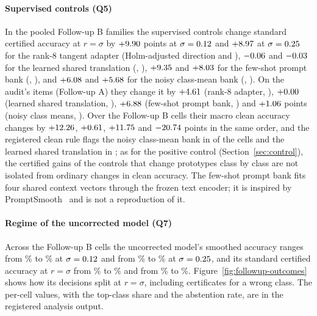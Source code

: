 \paragraph{Supervised controls (Q5)}
In the pooled Follow-up B families the supervised controls change standard
certified accuracy at $r=\sigma$ by $+9.90$ points at
$\sigma=0.12$ and $+8.97$ at $\sigma=0.25$
for the rank-8 tangent adapter (Holm-adjusted direction \FUQFiveLowLowrankDir{}
and \FUQFiveHighLowrankDir), $-0.06$ and
$-0.03$ for the learned shared translation
(\FUQFiveLowSharedDir, \FUQFiveHighSharedDir), $+9.35$ and
$+8.03$ for the few-shot prompt bank
(\FUQFiveLowFewshotDir, \FUQFiveHighFewshotDir), and
$+6.08$ and $+5.68$ for the noisy
class-mean bank (\FUQFiveLowNoisyMeanDir, \FUQFiveHighNoisyMeanDir). On the
audit's items (Follow-up A) they change it by $+4.61$ (rank-8
adapter, \FUQFiveALowrankDir), $+0.00$ (learned shared
translation, \FUQFiveASharedDir), $+6.88$ (few-shot prompt
bank, \FUQFiveAFewshotDir) and $+1.06$ points (noisy class
means, \FUQFiveANoisyMeanDir). Over the Follow-up B cells their macro clean
accuracy changes by $+12.26$, $+0.61$,
$+11.75$ and $-20.74$ points in the same order,
and the registered clean rule flags the noisy class-mean bank in
\FUQFiveNoisyMeanCleanFlagged{} of the \FUCellsB{} cells and the learned shared
translation in \FUQFiveSharedCleanFlagged{}; as for the positive control
(Section~\ref{sec:control}), the certified gains of the controls that change
prototypes class by class are not isolated from ordinary changes in clean
accuracy. The few-shot prompt bank fits four shared context vectors through the frozen text
encoder; it is inspired by PromptSmooth~\cite{hussein2024promptsmooth} and is
not a reproduction of it.

\paragraph{Regime of the uncorrected model (Q7)}
Across the Follow-up B cells the uncorrected model's smoothed accuracy ranges
from \FUQSevenLowSmoothedLo\% to \FUQSevenLowSmoothedHi\% at
$\sigma=0.12$ and from \FUQSevenHighSmoothedLo\% to
\FUQSevenHighSmoothedHi\% at $\sigma=0.25$, and its standard certified
accuracy at $r=\sigma$ from \FUQSevenLowStdCALo\% to \FUQSevenLowStdCAHi\% and
from \FUQSevenHighStdCALo\% to \FUQSevenHighStdCAHi\%.
Figure~\ref{fig:followup-outcomes} shows how its decisions split at
$r=\sigma$, including certificates for a wrong class. The per-cell values, with
the top-class share and the abstention rate, are in the registered analysis
output.

